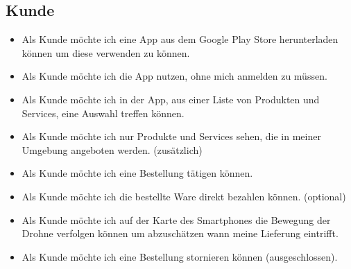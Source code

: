 \subsection{Kunde}
\begin{itemize}
	\item Als Kunde möchte ich eine App aus dem Google Play Store herunterladen können um diese verwenden zu können.
	\item Als Kunde möchte ich die App nutzen, ohne mich anmelden zu müssen.
	\item Als Kunde möchte ich in der App, aus einer Liste von Produkten und Services, eine Auswahl treffen können.
	\item Als Kunde möchte ich nur Produkte und Services sehen, die in meiner Umgebung angeboten werden. (zusätzlich)
	\item Als Kunde möchte ich eine Bestellung tätigen können.
	\item Als Kunde möchte ich die bestellte Ware direkt bezahlen können. (optional)
	\item Als Kunde möchte ich auf der Karte des Smartphones die Bewegung der Drohne verfolgen können um abzuschätzen wann meine Lieferung eintrifft.
	\item Als Kunde möchte ich eine Bestellung stornieren können (ausgeschlossen).
\end{itemize}

